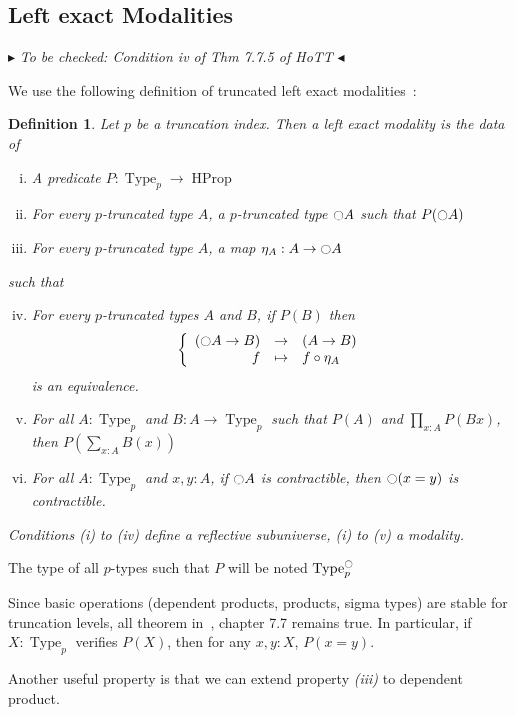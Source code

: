 \documentclass[conference]{IEEEtran}
\newtheorem{defi}[thm]{Definition}
\newcommand{\mynote}[2]{
    \fbox{\bfseries\sffamily\scriptsize#1}
    {\small$\blacktriangleright$\textsf{\emph{#2}}$\blacktriangleleft$}~}
\newcommand\nt[1]{\mynote{NT}{#1}}
\DeclareMathOperator{\Type}{Type}
\DeclareMathOperator{\HProp}{HProp}
\newcommand{\modal}{\ensuremath{\ocircle}}
\begin{document}
\subsection{Left exact Modalities}
\label{sec:lexmod}

\nt{
To be checked:
  Condition iv of Thm 7.7.5 of HoTT
}


We use the following definition of truncated left exact modalities~:
\begin{defi}
  Let $p$ be a truncation index. Then a left exact modality is the
  data of
  \begin{enumerate}[(i)]
  \item A predicate $P:\Type_p \to \HProp$
  \item For every $p$-truncated type $A$, a $p$-truncated type
    $\modal A$ such that $P(\modal A)$
  \item For every $p$-truncated type $A$, a map $\eta_A:A \to
    \modal A$
  \end{enumerate}
  such that
  \begin{enumerate}[(i)]
    \setcounter{enumi}{3}
  \item For every $p$-truncated types $A$ and $B$, if $P(B)$ then
    $$\left\{
      \begin{array}{rcl}
        (\modal A \to B) & \to & (A \to B) \\
        f & \mapsto & f \circ \eta_A
      \end{array} \right.$$
    is an equivalence.
  \item For all $A:\Type_p$ and $B:A \to \Type_p$ such that $P(A)$
    and $\prod_{x:A} P(B x)$, then $P\left( \sum_{x:A} B(x)\right)$
  \item For all $A:\Type_p$ and $x,y:A$, if $\modal A$ is
    contractible, then $\modal (x=y)$ is contractible.
  \end{enumerate}
  Conditions (i) to (iv) define a {\em reflective subuniverse}, (i) to
  (v) a {\em modality}.
\end{defi}

The type of all $p$-types such that $P$ will be noted $\Type^\modal_p$

Since basic operations (dependent products, products, sigma types) are
stable for truncation levels, all theorem in~\cite{hottbook}, chapter
7.7 remains true.
In particular, if $X:\Type_p$ verifies $P(X)$, then for any $x,y:X$, $P(x=y)$.

Another useful property is that we can extend property {\it (iii)} to
dependent product.
\end{document}
